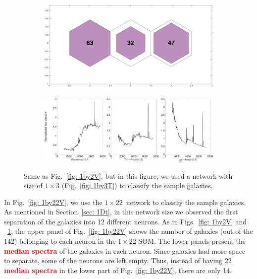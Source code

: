             \begin{figure}
                \begin{subfigure}[b]{0.5\textwidth}
                    \centering
                    \includegraphics[width=\textwidth]{images0.01/1d/hit_v_1_by_3.png}
                \end{subfigure}
                \hfill
                \begin{subfigure}[b]{0.5\textwidth}
                     \includegraphics[width=\textwidth]{images0.01/1d/SED_total1by3_fluxdensity.png}
                \end{subfigure}
                \caption[Classification of fitted galaxy SEDs from \citet{Hossein12} using the $1\times3$~networks]{Same as Fig.~\ref{fig: 1by2V}, but in this figure, we used a network with size of $1\times3$ (Fig.~\ref{fig: 1by3T}) to classify the sample galaxies.}
                \label{fig: 1by3V}
            \end{figure}       
            
            In Fig.~\ref{fig: 1by22V}, we use the $1\times22$~network to classify the sample galaxies.
            As mentioned in Section~\ref{sec: 1Dt}, in this network size we observed the first separation of the  galaxies into 12 different neurons.
           As in Figs.~\ref{fig: 1by2V} and ~\ref{fig: 1by3V}, the upper panel of Fig.~\ref{fig: 1by22V} shows the number of galaxies (out of the 142) belonging to each neuron in the $1\times22$ SOM.
            The lower panels present the \textbf{\textcolor{red}{median spectra}} of the galaxies in each neuron.
            Since galaxies had more space to separate, some of the neurons are left empty.
            Thus, instead of having 22 \textbf{\textcolor{red}{median spectra}} in the lower part of Fig.~\ref{fig: 1by22V}, there are only 14.

